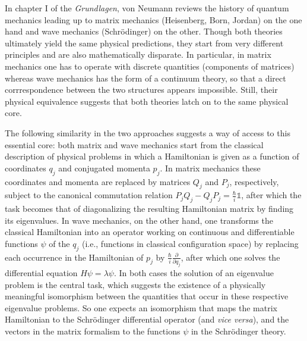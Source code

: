 \documentclass[11pt]{article}
\begin{document}
In chapter I of the \emph{Grundlagen}, von Neumann reviews the history of quantum mechanics leading up to matrix mechanics (Heisenberg, Born, Jordan) on the one hand and wave mechanics (Schr\"{o}dinger) on the other. Though both theories ultimately yield the same physical predictions, they start from very different principles and are also mathematically disparate. In particular, in matrix mechanics one has to operate with discrete quantities (components of matrices) whereas wave mechanics has the form of a continuum theory, so that a direct corrrespondence between the two structures appears impossible. Still, their physical equivalence suggests that both theories latch on to the same physical core.

The following similarity in the two approaches suggests a way of access to this essential core: both matrix and wave mechanics start from the classical description of physical problems in which a Hamiltonian is given as a function of coordinates $q_j$ and conjugated momenta $p_j$. In matrix mechanics these coordinates and momenta are replaced by matrices $Q_j$ and $P_j$, respectively, subject to the canonical commutation relation $P_j Q_j - Q_j P_j = \frac{\hbar}{i} \mathbb{1} $, after which the task becomes that of diagonalizing the resulting Hamiltonian matrix by finding its eigenvalues. In wave mechanics, on the other hand, one transforms the classical Hamiltonian into an operator working on continuous and differentiable functions $\psi$ of the $q_j$ (i.e., functions in classical configuration space) by replacing each occurrence in the Hamiltonian of $p_j$ by $\frac{\hbar}{i} \frac{\partial}{\partial q_j}$, after which one solves the differential equation $H \psi = \lambda \psi$. In both cases the solution of an eigenvalue problem is the central task, which suggests the existence of a physically meaningful isomorphism between the quantities that occur in these respective eigenvalue problems. So one expects an isomorphism that maps the matrix Hamiltonian to the Schr\"{o}dinger differential operator (and \emph{vice versa}), and the vectors in the matrix formalism to the functions $\psi$ in the Schr\"{o}dinger theory.
\end{document}

